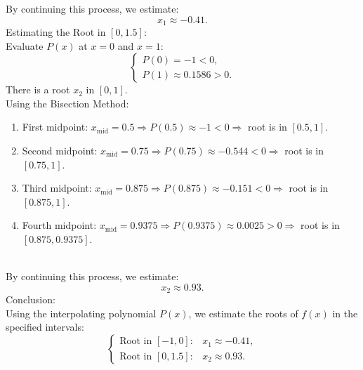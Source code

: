 \documentclass{article}
\begin{document}
By continuing this process, we estimate:
\[
    x_1 \approx -0.41.
\]
Estimating the Root in \([0, 1.5]\):
\\
Evaluate \( P(x) \) at \( x = 0 \) and \( x = 1 \):
\[
\begin{cases}
P(0) = -1 < 0, \\
P(1) \approx 0.1586 > 0.
\end{cases}
\]
There is a root \( x_2 \) in \([0, 1]\).
\\
Using the Bisection Method:
\begin{enumerate}
    \item First midpoint: \( x_{\text{mid}} = 0.5 \Rightarrow P(0.5) \approx -1 < 0 \Rightarrow \) root is in \([0.5, 1]\).
    \item Second midpoint: \( x_{\text{mid}} = 0.75 \Rightarrow P(0.75) \approx -0.544 < 0 \Rightarrow \) root is in \([0.75, 1]\).
    \item Third midpoint: \( x_{\text{mid}} = 0.875 \Rightarrow P(0.875) \approx -0.151 < 0 \Rightarrow \) root is in \([0.875, 1]\).
    \item Fourth midpoint: \( x_{\text{mid}} = 0.9375 \Rightarrow P(0.9375) \approx 0.0025 > 0 \Rightarrow \) root is in \([0.875, 0.9375]\).
\end{enumerate}
\\
By continuing this process, we estimate:
\[
x_2 \approx 0.93.
\]
Conclusion:
\\
Using the interpolating polynomial \( P(x) \), we estimate the roots of \( f(x) \) in the specified intervals:
\[
\begin{cases}
\text{Root in } [-1, 0]: & x_1 \approx -0.41, \\
\text{Root in } [0, 1.5]: & x_2 \approx 0.93.
\end{cases}
\]
\end{document}
